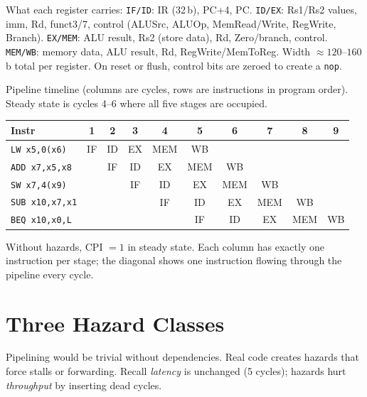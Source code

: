 What each register carries: \texttt{IF/ID}: IR (32\,b), PC+4, PC. \texttt{ID/EX}: Rs1/Rs2 values, imm, Rd, funct3/7, control (ALUSrc, ALUOp, MemRead/Write, RegWrite, Branch). \texttt{EX/MEM}: ALU result, Rs2 (store data), Rd, Zero/branch, control. \texttt{MEM/WB}: memory data, ALU result, Rd, RegWrite/MemToReg. Width $\approx 120$--$160$\,b total per register. On reset or flush, control bits are zeroed to create a \texttt{nop}.

Pipeline timeline (columns are cycles, rows are instructions in program order). Steady state is cycles 4--6 where all five stages are occupied.

\begin{center}
\small
\begin{tabular}{lccccccccc}
\toprule Instr & 1 & 2 & 3 & 4 & 5 & 6 & 7 & 8 & 9\\ \midrule
\texttt{LW  x5,0(x6)}  & \cellcolor{blue!10}IF & \cellcolor{green!10}ID & \cellcolor{orange!10}EX & \cellcolor{red!10}MEM & \cellcolor{violet!10}WB & & & &\\
\texttt{ADD x7,x5,x8}  & & \cellcolor{blue!10}IF & \cellcolor{green!10}ID & \cellcolor{orange!10}EX & \cellcolor{red!10}MEM & \cellcolor{violet!10}WB & & &\\
\texttt{SW  x7,4(x9)}  & & & \cellcolor{blue!10}IF & \cellcolor{green!10}ID & \cellcolor{orange!10}EX & \cellcolor{red!10}MEM & \cellcolor{violet!10}WB & &\\
\texttt{SUB x10,x7,x1} & & & & \cellcolor{blue!10}IF & \cellcolor{green!10}ID & \cellcolor{orange!10}EX & \cellcolor{red!10}MEM & \cellcolor{violet!10}WB &\\
\texttt{BEQ x10,x0,L}  & & & & & \cellcolor{blue!10}IF & \cellcolor{green!10}ID & \cellcolor{orange!10}EX & \cellcolor{red!10}MEM & \cellcolor{violet!10}WB\\ \bottomrule
\end{tabular}
\end{center}
Without hazards, CPI $=1$ in steady state. Each column has exactly one instruction per stage; the diagonal shows one instruction flowing through the pipeline every cycle.

\section{Three Hazard Classes}
Pipelining would be trivial without dependencies. Real code creates hazards that force stalls or forwarding. Recall \emph{latency} is unchanged (5 cycles); hazards hurt \emph{throughput} by inserting dead cycles.

